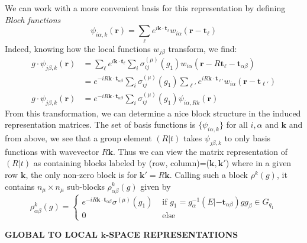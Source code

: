 \documentclass[9 pt]{report}
\def\*#1{\boldsymbol{#1}}
\begin{document}
\noindent We can work with a more convenient basis for this representation by defining \emph{Bloch functions}
$$ \psi_{i\alpha,k}(\*r) = \sum_\ell e^{i\*k\cdot \*t_\ell}w_{i\alpha}(\*r - \*t_\ell) $$
Indeed, knowing how the local functions $w_{j\beta}$ transform, we find:
\begin{align*}
g\cdot\psi_{j\beta,k}(\*r) &= \sum_\ell e^{i\*k\cdot \*t_\ell} \sum_i \sigma^{(\mu)}_{ij}(g_1) w_{i\alpha}(\*r - R\*t_\ell - \*t_{\alpha\beta}) \\
&= e^{-iR\*k\cdot \*t_{\alpha\beta}}\sum_i \sigma^{(\mu)}_{ij}(g_1) \sum_{\ell'} e^{iR\*k\cdot \*t_{\ell'}}  w_{i\alpha}(\*r - \*t_{\ell'})\\
g\cdot \psi_{j\beta,k}(\*r)& =  e^{-iR\*k\cdot \*t_{\alpha\beta}}\sum_i \sigma^{(\mu)}_{ij}(g_1) \psi_{i\alpha,Rk}(\*r)
\end{align*}
From this transformation, we can determine a nice block structure in the induced representation matrices. The set of basis functions is $\{ \psi_{i\alpha,k} \}$ for all $ i,\alpha$ and $\*k$ and from above, we see that a group element $(R|t)$ takes $\psi_{j\beta,k}$ to only basis functions with wavevector $R\*k$. Thus we can view the matrix representation of $(R|t)$ as containing blocks labeled by (row, column)=($\*k,\*k'$) where in a given row $\*k$, the only non-zero block is for $\*k'=R\*k$. Calling such a block $\rho^k(g)$, it contains $n_\mu\times n_\mu$ sub-blocks $\rho_{\alpha\beta}^k(g)$ given by
$$ \rho^k_{\alpha\beta}(g) = \begin{cases}
e^{-iR\*k\cdot \*t_{\alpha\beta}} \sigma^{(\mu)}\left(g_1\right) & \text{ if } g_1=g_\alpha^{-1}(E|-\*t_{\alpha\beta})gg_\beta\in G_{q_1} \\
0 & \text{ else}
\end{cases}$$

\begin{center}
	\textbf{GLOBAL TO LOCAL $\*k$-SPACE REPRESENTATIONS}
\end{center}
\end{document}

